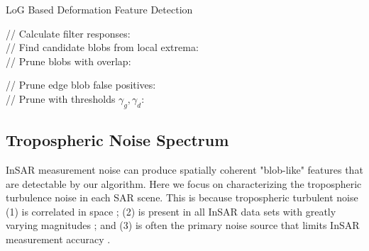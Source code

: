 \begin{algorithm}
	\caption{LoG Based Deformation Feature Detection}\label{algo:blobs}
	\SetAlgoLined
	
	// Calculate filter responses:\\
	// Find candidate blobs from local extrema:\\
	\For{$ (i, j, m) \in  L $}{
		\If{$L[i, j, m] $ is local extremum }{
				Compute $ r = \sqrt{2}\sigma_m $ \\
				Add $ (i, j, r) $ to list of candidate detections
			}
		}
		// Prune blobs with overlap:\\
		
		// Prune edge blob false positives:\\
		// Prune with thresholds $ \gamma_g, \gamma_d $:\\
	\end{algorithm}
	
	
	
\subsection{Tropospheric Noise Spectrum}
\label{subsec:methods-2-tropo-spectrum}
InSAR measurement noise can produce spatially coherent "blob-like" features that are detectable by our algorithm.  Here we focus on characterizing the tropospheric turbulence noise in each SAR scene. This is because tropospheric turbulent noise (1) is correlated in space \citep{Emardson2003NeutralAtmosphericDelay, Lohman2005SomeThoughtsUse}; (2) is present in all InSAR data sets with greatly varying magnitudes \citep{Barnhart2013CharacterizingEstimatingNoise, Hooper2012RecentAdvancesSar}; and (3) is often the primary noise source that limits InSAR measurement accuracy \citep{Jolivet2014ImprovingInsarGeodesy, Bekaert2015StatisticalComparisonInsar, Parker2015SystematicAssessmentAtmospheric}.


